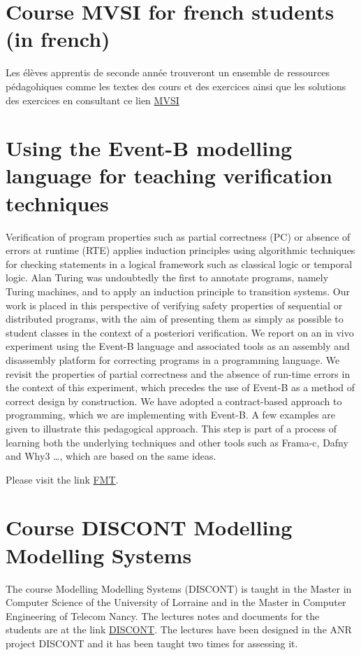 \documentclass[ 12pt]{article}
\begin{document}
\section{Course MVSI for french students (in french) }



Les élèves    apprentis de seconde année
trouveront un ensemble de ressources pédagohiques comme les 
textes des cours et des exercices ainsi que les solutions des
exercices en consultant ce lien
\href{https://mery54.github.io/teaching/mvsi}{MVSI}


\section{Using  the Event-B modelling language  for teaching verification 
techniques }

Verification of program properties such as partial correctness (PC) or
absence of errors at runtime (RTE) applies induction principles using
algorithmic techniques for checking statements in a logical framework
such as classical logic or temporal logic.  Alan Turing was
undoubtedly the first to annotate programs, namely Turing machines,
and to apply an induction principle to transition systems.  Our work
is placed in this perspective of verifying safety properties of
sequential or distributed programs, with the aim of presenting them as
simply as possible to student classes in the context of a posteriori
verification.  We report on an in vivo experiment using the Event-B
language and associated tools as an assembly and disassembly platform
for correcting programs in a programming language.  We revisit the
properties of partial correctness and the absence of run-time errors
in the context of this experiment, which precedes the use of Event-B as a method of correct design by construction.  We have adopted a contract-based approach to programming, which we are implementing with Event-B.  A few examples are given to illustrate this pedagogical approach.  This step is part of a process of learning both the underlying techniques and other tools such as Frama-c, Dafny and Why3 \ldots, which are based on the same ideas.

Please visit the link \href{https://mery54.github.io/fmt}{FMT}.




\section{ Course DISCONT  Modelling Modelling Systems}
\label{sec:course-mosos-modell}


The   course   Modelling Modelling Systems  (DISCONT) is taught in
the Master  in Computer Science of the University of Lorraine  and in
the Master in Computer Engineering of Telecom Nancy. The  lectures notes  and documents for the students  are  at the link
\href{https://mery54.github.io/discont}{DISCONT}.  The lectures have
been designed  in the ANR project DISCONT  and it has been taught two
times  for assessing it.
\end{document}
